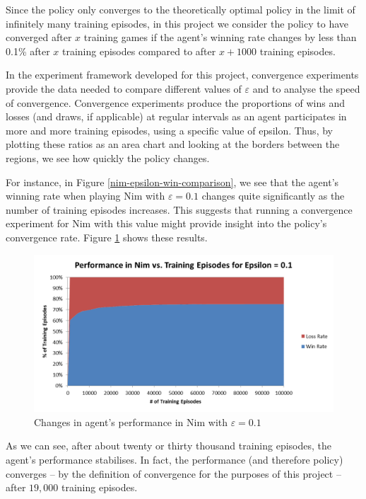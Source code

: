 \documentclass[11pt,a4paper]{report}
\begin{document}
Since the policy only converges to the theoretically optimal policy in the limit of infinitely many training episodes, in this project we consider the policy to have converged after $x$ training games if the agent's winning rate changes by less than 0.1\% after $x$ training episodes compared to after $x+1000$ training episodes.

In the experiment framework developed for this project, convergence experiments provide the data needed to compare different values of $\varepsilon$ and to analyse the speed of convergence. Convergence experiments produce the proportions of wins and losses (and draws, if applicable) at regular intervals as an agent participates in more and more training episodes, using a specific value of epsilon. Thus, by plotting these ratios as an area chart and looking at the borders between the regions, we see how quickly the policy changes.

For instance, in Figure \ref{nim-epsilon-win-comparison}, we see that the agent's winning rate when playing Nim with $\varepsilon = 0.1$ changes quite significantly as the number of training episodes increases. This suggests that running a convergence experiment for Nim with this value might provide insight into the policy's convergence rate. Figure \ref{nim-0-1-convergence} shows these results.

\begin{figure}[htbp]
	\begin{center}
		\includegraphics[width=125mm]{Nim_PerformanceResults_0_1.png}
		\caption{Changes in agent's performance in Nim with $\varepsilon = 0.1$}
		\label{nim-0-1-convergence}
	\end{center}
\end{figure}

As we can see, after about twenty or thirty thousand training episodes, the agent's performance stabilises. In fact, the performance (and therefore policy) converges -- by the definition of convergence for the purposes of this project -- after $19,000$ training episodes.
\end{document}
